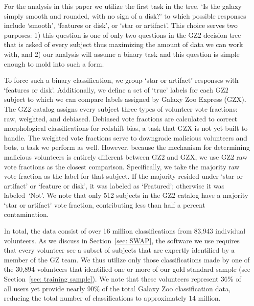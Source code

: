 \documentclass[twocolumn]{aastex6}
\newcommand{\feat}{`Featured'}
\newcommand{\notfeat}{`Not'}
\begin{document}
For the analysis in this paper we utilize the first task in the tree, 
`Is the galaxy simply smooth and rounded, with no sign of a disk?' to which possible 
responses include `smooth', `features or disk', or `star or artifact'. This choice
serves two purposes: 1) this question is one of only two questions in the GZ2
decision tree that is asked of every subject thus maximizing the amount of data
we can work with, and 2) our analysis will assume a 
binary task and this question is simple enough to mold into such a form. 

To force such a binary classification, we group `star or artifact' responses with `features or disk'. 
Additionally, we define a set of `true' labels for each GZ2 subject to which
we can compare labels assigned by Galaxy Zoo Express (GZX).  
The GZ2 catalog assigns every subject three types of volunteer vote fractions: 
raw, weighted, and debiased. 
Debiased vote fractions are calculated to correct morphological classifications
for redshift bias, a task that GZX is not yet built to handle. 
The weighted vote fractions serve to downgrade malicious volunteers and bots, 
a task we perform as well. However, because the mechanism for
determining malicious volunteers is entirely different between GZ2 and GZX, 
we use GZ2 raw vote fractions as the closest comparison. 
Specifically, we take the majority raw vote fraction as the label for that subject. If the 
majority resided under `star or artifact' or `feature or disk', it was labeled as \feat; 
otherwise it was labeled~\notfeat. We note that only 512 subjects in the GZ2 
catalog have a majority `star or artifact' vote 
fraction, contributing less than half a percent contamination. 

In total, the data consist of over 16 million classifications from 83,943 individual volunteers. 
As we discuss in Section~\ref{sec: SWAP}, the software we use requires that every 
volunteer see a subset of subjects that are expertly identified by a member of the GZ team. 
We thus utilize only those classifications made by one of the 30,894 volunteers that 
identified one or more of our gold standard sample (see Section~\ref{sec: training sample}). 
We note that these volunteers represent 36\% of all users 
yet provide nearly 90\% of the total Galaxy Zoo classification data, 
reducing the total number of classifications to approximately 14 million.





\end{document}
